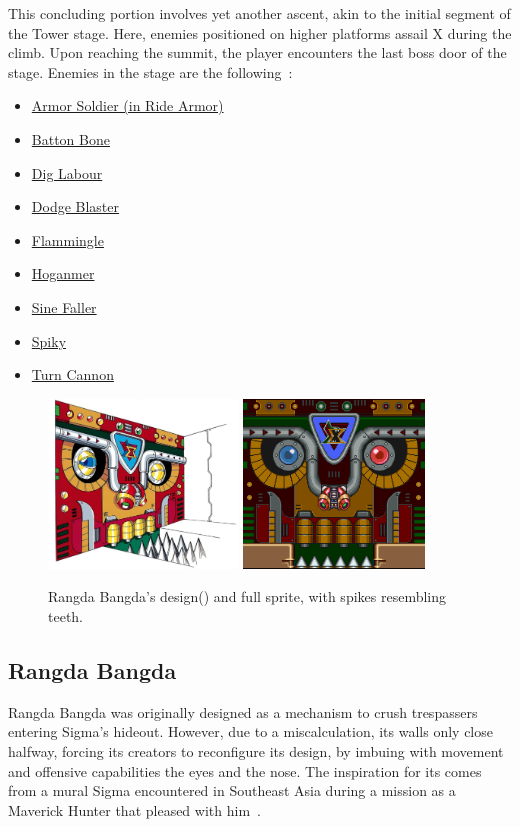 This concluding portion involves yet another ascent, akin to the initial segment of the Tower stage. Here, enemies positioned on higher platforms assail X during the climb. Upon reaching the summit, the player encounters the last boss door of the stage.
Enemies in the stage are the following~\cite{wiki:sigma_stages}:
\begin{itemize}
	\item \hyperlink{enem:Armor_Soldier}{Armor Soldier (in Ride Armor)}
	\item \hyperlink{enem:Batton_Bone}{Batton Bone}
	\item \hyperlink{enem:Dig_Labour}{Dig Labour}
	\item \hyperlink{enem:Dodge_Blaster}{Dodge Blaster}
	\item \hyperlink{enem:Flammingle}{Flammingle}
	\item \hyperlink{enem:Hoganmer}{Hoganmer}
	\item \hyperlink{enem:Sine_Faller}{Sine Faller}
	\item \hyperlink{enem:Spiky}{Spiky}
	\item \hyperlink{enem:Turn_Cannon}{Turn Cannon}
\end{itemize} 
\begin{figure}[htp]
	\centering
	\includegraphics[height=4.5cm]{figures/X1/Sigma_stages/RangdaBangda.jpg}
	\includegraphics[height=4.5cm]{figures/X1/Sigma_stages/Rangdabangdasprite.png}
	\caption{Rangda Bangda's design(\cite{book:MMX_Complete_art}) and full sprite, with spikes resembling teeth.}
\end{figure}
\subsection{Rangda Bangda}\label{boss:Rangda_bangda}
Rangda Bangda was originally designed as a mechanism to crush trespassers entering Sigma's hideout. However, due to a miscalculation, its walls only close halfway, forcing its creators to reconfigure its design, by imbuing with movement and offensive capabilities the eyes and the nose. The inspiration for its comes from a mural Sigma encountered in Southeast Asia during a mission as a Maverick Hunter that pleased with him~\cite{wayback:X_resources}.

